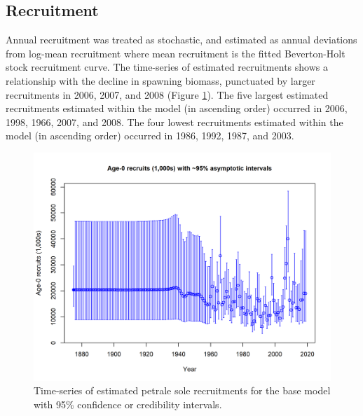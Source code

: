 \documentclass[12pt,]{article}
\begin{document}
\FloatBarrier

\subsection*{Recruitment}\label{recruitment}

Annual recruitment was treated as stochastic, and estimated as annual
deviations from log-mean recruitment where mean recruitment is the
fitted Beverton-Holt stock recruitment curve. The time-series of
estimated recruitments shows a relationship with the decline in spawning
biomass, punctuated by larger recruitments in 2006, 2007, and 2008
(Figure \ref{fig:Recruits_all}). The five largest estimated recruitments
estimated within the model (in ascending order) occurred in 2006, 1998,
1966, 2007, and 2008. The four lowest recruitments estimated within the
model (in ascending order) occurred in 1986, 1992, 1987, and 2003.

\begin{figure}
\centering
\includegraphics{r4ss/plots_mod1/ts11_Age-0_recruits_(1000s)_with_95_asymptotic_intervals.png}
\caption{Time-series of estimated petrale sole recruitments for the base
model with 95\% confidence or credibility intervals.
\label{fig:Recruits_all}}
\end{figure}
\end{document}
